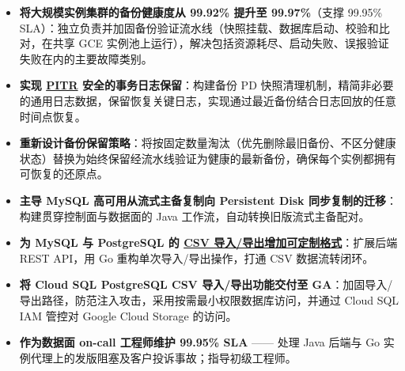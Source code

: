\documentclass{resume_cn-v2}
\begin{document}
\begin{itemize}
  \item \textbf{将大规模实例集群的备份健康度从 99.92\% 提升至 99.97\%}（支撑 99.95\% SLA）：独立负责并加固备份验证流水线（快照挂载、数据库启动、校验和比对，在共享 GCE 实例池上运行），解决包括资源耗尽、启动失败、误报验证失败在内的主要故障类别。
  \item \textbf{实现 \href{https://cloud.google.com/sql/docs/mysql/backup-recovery/manage-standard-backups\#point-in-time_recovery}{PITR} 安全的事务日志保留}：构建备份 PD 快照清理机制，精简非必要的通用日志数据，保留恢复关键日志，实现通过最近备份结合日志回放的任意时间点恢复。
  \item \textbf{重新设计备份保留策略}：将按固定数量淘汰（优先删除最旧备份、不区分健康状态）替换为始终保留经流水线验证为健康的最新备份，确保每个实例都拥有可恢复的还原点。
  \item \textbf{主导 MySQL 高可用从流式主备复制向 Persistent Disk 同步复制的迁移}：构建贯穿控制面与数据面的 Java 工作流，自动转换旧版流式主备配对。
  \item \textbf{为 MySQL 与 PostgreSQL 的 \href{https://cloud.google.com/sql/docs/postgres/import-export/import-export-csv}{CSV 导入/导出增加可定制格式}}：扩展后端 REST API，用 Go 重构单次导入/导出操作，打通 CSV 数据流转闭环。
  \item \textbf{将 Cloud SQL PostgreSQL CSV 导入/导出功能交付至 GA}：加固导入/导出路径，防范注入攻击，采用按需最小权限数据库访问，并通过 Cloud SQL IAM 管控对 Google Cloud Storage 的访问。
  \item \textbf{作为数据面 on-call 工程师维护 99.95\% SLA} —— 处理 Java 后端与 Go 实例代理上的发版阻塞及客户投诉事故；指导初级工程师。
\end{itemize}
\end{document}
